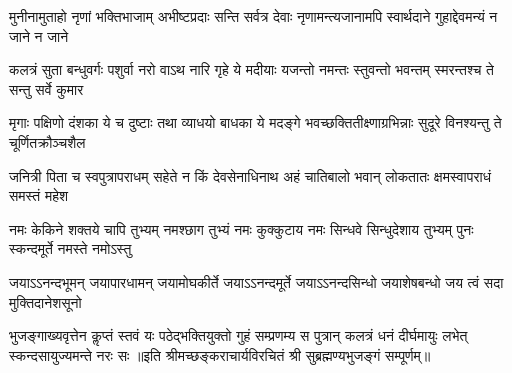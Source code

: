 \fourlineindentedshloka
{मुनीनामुताहो नृणां भक्तिभाजाम्}
{अभीष्टप्रदाः सन्ति सर्वत्र देवाः}
{नृणामन्त्यजानामपि स्वार्थदाने}
{गुहाद्देवमन्यं न जाने न जाने}

\fourlineindentedshloka
{कलत्रं सुता बन्धुवर्गः पशुर्वा}
{नरो वाऽथ नारि गृहे ये मदीयाः}
{यजन्तो नमन्तः स्तुवन्तो भवन्तम्}
{स्मरन्तश्च ते सन्तु सर्वे कुमार}

\fourlineindentedshloka
{मृगाः पक्षिणो दंशका ये च दुष्टाः}
{तथा व्याधयो बाधका ये मदङ्गे}
{भवच्छक्तितीक्ष्णाग्रभिन्नाः सुदूरे}
{विनश्यन्तु ते चूर्णितक्रौञ्चशैल}

\fourlineindentedshloka
{जनित्री पिता च स्वपुत्रापराधम्}
{सहेते न किं देवसेनाधिनाथ}
{अहं चातिबालो भवान् लोकतातः}
{क्षमस्वापराधं समस्तं महेश}

\fourlineindentedshloka
{नमः केकिने शक्तये चापि तुभ्यम्}
{नमश्छाग तुभ्यं नमः कुक्कुटाय}
{नमः सिन्धवे सिन्धुदेशाय तुभ्यम्}
{पुनः स्कन्दमूर्ते नमस्ते नमोऽस्तु}

\fourlineindentedshloka
{जयाऽऽनन्दभूमन् जयापारधामन्}
{जयामोघकीर्ते जयाऽऽनन्दमूर्ते}
{जयाऽऽनन्दसिन्धो जयाशेषबन्धो}
{जय त्वं सदा मुक्तिदानेशसूनो}

\fourlineindentedshloka
{भुजङ्गाख्यवृत्तेन कॢप्तं स्तवं यः}
{पठेद्भक्तियुक्तो गुहं सम्प्रणम्य}
{स पुत्रान् कलत्रं धनं दीर्घमायुः}
{लभेत् स्कन्दसायुज्यमन्ते नरः सः}
॥इति  श्रीमच्छङ्कराचार्यविरचितं श्री सुब्रह्मण्यभुजङ्गं सम्पूर्णम्॥
